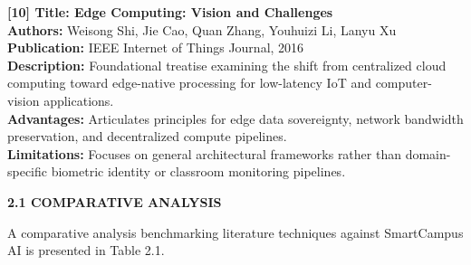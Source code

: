 \vspace{0.15in}
\begin{flushleft}
{\fontsize{12pt}{14pt}\selectfont \textbf{[10] Title: Edge Computing: Vision and Challenges}} \\
\textbf{Authors:} Weisong Shi, Jie Cao, Quan Zhang, Youhuizi Li, Lanyu Xu \\
\textbf{Publication:} IEEE Internet of Things Journal, 2016 \\
\textbf{Description:} Foundational treatise examining the shift from centralized cloud computing toward edge-native processing for low-latency IoT and computer-vision applications. \\
\textbf{Advantages:} Articulates principles for edge data sovereignty, network bandwidth preservation, and decentralized compute pipelines. \\
\textbf{Limitations:} Focuses on general architectural frameworks rather than domain-specific biometric identity or classroom monitoring pipelines.
\end{flushleft}

\vspace{0.2in}
\begin{flushleft}
{\fontsize{14pt}{18pt}\selectfont \textbf{2.1 COMPARATIVE ANALYSIS}}\\[2mm]
\end{flushleft}

\noindent A comparative analysis benchmarking literature techniques against SmartCampus AI is presented in Table 2.1.

